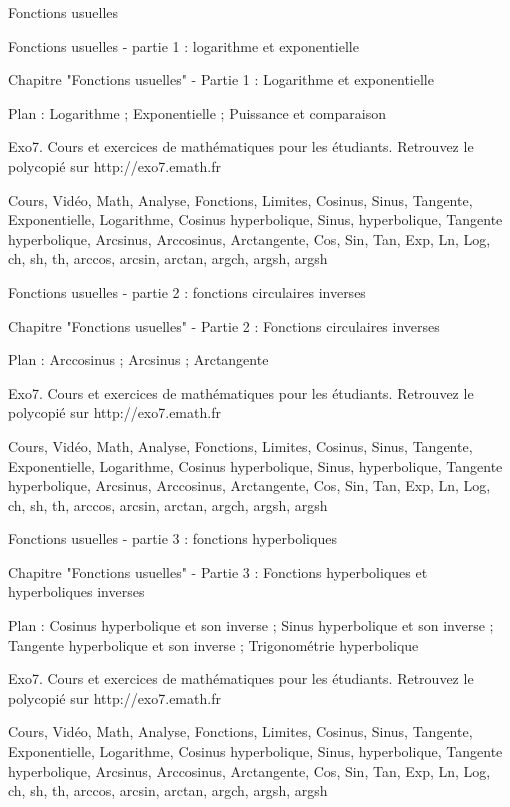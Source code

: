 
   Fonctions usuelles

Fonctions usuelles - partie 1 : logarithme et exponentielle



Chapitre "Fonctions usuelles" - Partie 1 : Logarithme et exponentielle

Plan : Logarithme ; Exponentielle ; Puissance et comparaison

Exo7. Cours et exercices de mathématiques pour les étudiants.
Retrouvez le polycopié sur http://exo7.emath.fr


Cours, Vidéo, Math, Analyse, Fonctions, Limites, Cosinus, Sinus, Tangente, Exponentielle, Logarithme, Cosinus hyperbolique, 
Sinus, hyperbolique, Tangente hyperbolique, Arcsinus, Arccosinus, Arctangente, Cos, Sin, Tan, Exp, Ln, Log, ch, sh, th, arccos, arcsin, arctan,
argch, argsh, argsh


Fonctions usuelles - partie 2 : fonctions circulaires inverses



Chapitre "Fonctions usuelles" - Partie 2 : Fonctions circulaires inverses

Plan : Arccosinus ; Arcsinus ; Arctangente

Exo7. Cours et exercices de mathématiques pour les étudiants.
Retrouvez le polycopié sur http://exo7.emath.fr


Cours, Vidéo, Math, Analyse, Fonctions, Limites, Cosinus, Sinus, Tangente, Exponentielle, Logarithme, Cosinus hyperbolique, 
Sinus, hyperbolique, Tangente hyperbolique, Arcsinus, Arccosinus, Arctangente, Cos, Sin, Tan, Exp, Ln, Log, ch, sh, th, arccos, arcsin, arctan,
argch, argsh, argsh


Fonctions usuelles - partie 3 : fonctions hyperboliques



Chapitre "Fonctions usuelles" - Partie 3 : Fonctions hyperboliques et hyperboliques inverses

Plan : Cosinus hyperbolique et son inverse ; Sinus hyperbolique et son inverse ; Tangente hyperbolique et son inverse ; Trigonométrie hyperbolique

Exo7. Cours et exercices de mathématiques pour les étudiants.
Retrouvez le polycopié sur http://exo7.emath.fr


Cours, Vidéo, Math, Analyse, Fonctions, Limites, Cosinus, Sinus, Tangente, Exponentielle, Logarithme, Cosinus hyperbolique, 
Sinus, hyperbolique, Tangente hyperbolique, Arcsinus, Arccosinus, Arctangente, Cos, Sin, Tan, Exp, Ln, Log, ch, sh, th, arccos, arcsin, arctan,
argch, argsh, argsh
